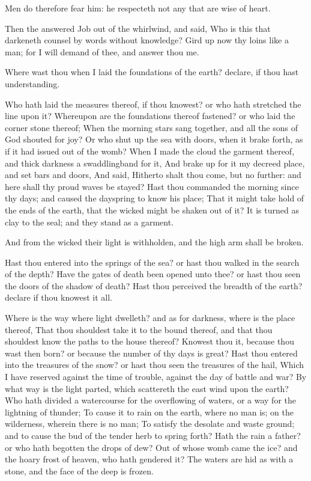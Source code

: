 \Verse Men do therefore fear him: he respecteth not any that are wise of heart.


\Chapter
\Verse Then the \LORD answered Job out of the whirlwind, and said, \Verse Who is this that darkeneth counsel by words without knowledge?  \Verse Gird up now thy loins like a man; for I will demand of thee, and answer thou me.

\Verse Where wast thou when I laid the foundations of the earth?  declare, if thou hast understanding.

\Verse Who hath laid the measures thereof, if thou knowest? or who hath stretched the line upon it?  \Verse Whereupon are the foundations thereof fastened? or who laid the corner stone thereof; \Verse When the morning stars sang together, and all the sons of God shouted for joy?  \Verse Or who shut up the sea with doors, when it brake forth, as if it had issued out of the womb?  \Verse When I made the cloud the garment thereof, and thick darkness a swaddlingband for it, \Verse And brake up for it my decreed place, and set bars and doors, \Verse And said, Hitherto shalt thou come, but no further: and here shall thy proud waves be stayed?  \Verse Hast thou commanded the morning since thy days; and caused the dayspring to know his place; \Verse That it might take hold of the ends of the earth, that the wicked might be shaken out of it?  \Verse It is turned as clay to the seal; and they stand as a garment.

\Verse And from the wicked their light is withholden, and the high arm shall be broken.

\Verse Hast thou entered into the springs of the sea? or hast thou walked in the search of the depth?  \Verse Have the gates of death been opened unto thee? or hast thou seen the doors of the shadow of death?  \Verse Hast thou perceived the breadth of the earth? declare if thou knowest it all.

\Verse Where is the way where light dwelleth? and as for darkness, where is the place thereof, \Verse That thou shouldest take it to the bound thereof, and that thou shouldest know the paths to the house thereof?  \Verse Knowest thou it, because thou wast then born? or because the number of thy days is great?  \Verse Hast thou entered into the treasures of the snow? or hast thou seen the treasures of the hail, \Verse Which I have reserved against the time of trouble, against the day of battle and war?  \Verse By what way is the light parted, which scattereth the east wind upon the earth?  \Verse Who hath divided a watercourse for the overflowing of waters, or a way for the lightning of thunder; \Verse To cause it to rain on the earth, where no man is; on the wilderness, wherein there is no man; \Verse To satisfy the desolate and waste ground; and to cause the bud of the tender herb to spring forth?  \Verse Hath the rain a father? or who hath begotten the drops of dew?  \Verse Out of whose womb came the ice? and the hoary frost of heaven, who hath gendered it?  \Verse The waters are hid as with a stone, and the face of the deep is frozen.

